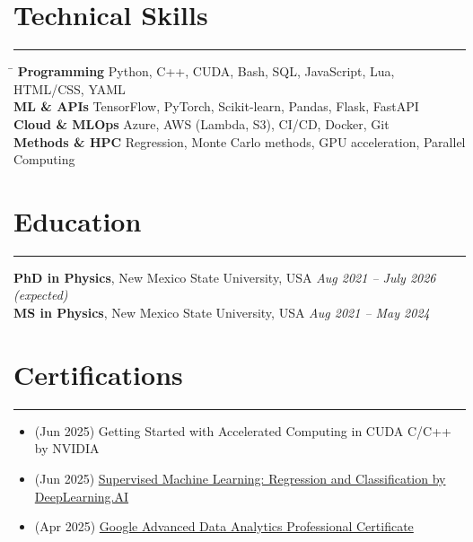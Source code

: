 \documentclass[11pt]{article}
\begin{document}
\section*{Technical Skills}
\hrule
\vspace{-0.3em}
\begin{tabbing}
\hspace{3.5cm} \= \kill
\textbf{Programming} \> Python, C++, CUDA, Bash, SQL, JavaScript, Lua, HTML/CSS, YAML \\
\textbf{ML \& APIs} \> TensorFlow, PyTorch, Scikit-learn, Pandas, Flask, FastAPI\\
\textbf{Cloud \& MLOps} \> Azure, AWS (Lambda, S3), CI/CD, Docker, Git\\
\textbf{Methods \& HPC} \> Regression, Monte Carlo methods, GPU acceleration, Parallel Computing
\end{tabbing}

\section*{Education}
\hrule
\vspace{0.3em}

\textbf{PhD in Physics}, New Mexico State University, USA \hfill \textit{Aug 2021 – July 2026 (expected)} \\
\textbf{MS in Physics}, New Mexico State University, USA \hfill \textit{Aug 2021 – May 2024} \\


\section*{Certifications}
\hrule
\vspace{-0.3em}
\begin{itemize}
    \item (Jun 2025) Getting Started with Accelerated Computing in CUDA C/C++ by NVIDIA
    \item (Jun 2025) \href{https://coursera.org/share/b9cffe9c5ba5832ffb99bf7abdd8c384}{Supervised Machine Learning: Regression and Classification by DeepLearning.AI} 
    \item (Apr 2025) \href{https://www.coursera.org/account/accomplishments/professional-cert/certificate/U0HU8UKT89L4}{Google Advanced Data Analytics Professional Certificate} 
\end{itemize}
\end{document}
